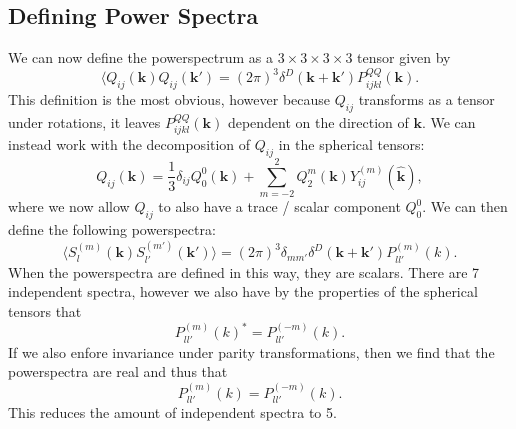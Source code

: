 \documentclass[11pt]{article}
\begin{document}
\subsection{Defining Power Spectra}
We can now define the powerspectrum as a $3 \times 3 \times 3 \times 3$ tensor given by
\begin{equation}
    \langle Q_{ij}(\mathbf k)Q_{ij}(\mathbf k') = (2 \pi)^3\delta^D(\mathbf k + \mathbf k')P_{ijkl}^{QQ}(\mathbf k).
\end{equation}
This definition is the most obvious, however because $Q_{ij}$ transforms as a tensor under rotations, it leaves $P_{ijkl}^{QQ}(\mathbf k)$ dependent on the direction of $\mathbf k$. We can instead work with the decomposition of $Q_{ij}$ in the spherical tensors:
\begin{equation}
    Q_{ij}(\mathbf k) = \frac{1}{3}\delta_{ij}Q_0^0(\mathbf k) + \sum_{m=-2}^2Q_2^m(\mathbf k)Y_{ij}^{(m)}(\hat{\mathbf k}),
\end{equation}
where we now allow $Q_{ij}$ to also have a trace / scalar component $Q_0^0$. %
We can then define the following powerspectra:
\begin{equation}
    \langle S_l^{(m)}(\mathbf k)S_{l'}^{(m')}(\mathbf k')\rangle = (2\pi)^3\delta_{mm'}\delta^D(\mathbf k + \mathbf k')P^{(m)}_{ll'}(k).
\end{equation}
When the powerspectra are defined in this way, they are scalars. There are 7 independent spectra, however we also have by the properties of the spherical tensors that
\begin{equation}
    P_{ll'}^{(m)}(k)^*=P_{ll'}^{(-m)}(k).
\end{equation}
If we also enfore invariance under parity transformations, then we find that the powerspectra are real and thus that
\begin{equation}
    P^{(m)}_{ll'}(k)=P^{(-m)}_{ll'}(k).
\end{equation}
This reduces the amount of independent spectra to 5. %
\end{document}
